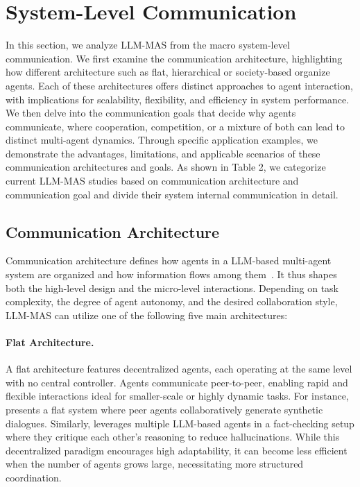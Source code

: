 \section{System-Level Communication}
In this section, we analyze LLM-MAS from the macro system-level communication. We first examine the communication architecture, highlighting how different architecture such as flat, hierarchical or society-based organize agents. Each of these architectures offers distinct approaches to agent interaction, with implications for scalability, flexibility, and efficiency in system performance. We then delve into the communication goals that decide why agents communicate, where cooperation, competition, or a mixture of both can lead to distinct multi-agent dynamics. Through specific application examples, we demonstrate the advantages, limitations, and applicable scenarios of these communication architectures and goals. As shown in Table 2, we categorize current LLM-MAS studies based on communication architecture and communication goal and divide their system internal communication in detail.

\subsection{Communication Architecture}
Communication architecture defines how agents in a LLM-based multi-agent system are organized and how information flows among them~\cite{mas_a_survey}. It thus shapes both the high-level design and the micro-level interactions. Depending on task complexity, the degree of agent autonomy, and the desired collaboration style, LLM-MAS can utilize one of the following five main architectures:


\paragraph{Flat Architecture.} A flat architecture features decentralized agents, each operating at the same level with no central controller. Agents communicate peer-to-peer, enabling rapid and flexible interactions ideal for smaller-scale or highly dynamic tasks. For instance, \cite{dataset_generation} presents a flat system where peer agents collaboratively generate synthetic dialogues. Similarly, \cite{debate_improve_llm_1} leverages multiple LLM-based agents in a fact-checking setup where they critique each other's reasoning to reduce hallucinations. While this decentralized paradigm encourages high adaptability, it can become less efficient when the number of agents grows large, necessitating more structured coordination.



